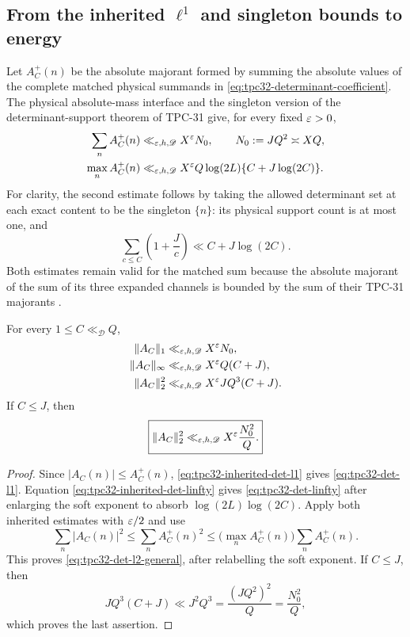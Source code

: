 \subsection{\texorpdfstring{From the inherited \(\ell^1\) and singleton
bounds to energy}{From the inherited l1 and singleton bounds to energy}}

Let $A_C^+(n)$ be the absolute majorant formed by summing the absolute
values of the complete matched physical summands in
\eqref{eq:tpc32-determinant-coefficient}.  The physical absolute-mass
interface and the singleton version of the determinant-support theorem
of TPC-31 give, for every fixed $\varepsilon>0$,
\begin{align}
 \sum_n A_C^+(n)
 &\ll_{\varepsilon,h,\mathscr D}X^\varepsilon N_0,
 \qquad N_0:=JQ^2\asymp XQ,
 \label{eq:tpc32-inherited-det-l1}\\
 \max_n A_C^+(n)
 &\ll_{\varepsilon,h,\mathscr D}
 X^\varepsilon Q\log(2L)
 \{C+J\log(2C)\}.
 \label{eq:tpc32-inherited-det-linfty}
\end{align}
For clarity, the second estimate follows by taking the allowed
determinant set at each exact content to be the singleton $\{n\}$:
its physical support count is at most one, and
\[
 \sum_{c\le C}\left(1+\frac Jc\right)
 \ll C+J\log(2C).
\]
Both estimates remain valid for the matched sum because the absolute
majorant of the sum of its three expanded channels is bounded by the
sum of their TPC-31 majorants \citep{WangTPC31}.

\begin{proposition}
\label{prop:tpc32-determinant-norms}
For every $1\le C\ll_{\mathscr D}Q$,
\begin{align}
 \|A_C\|_1
 &\ll_{\varepsilon,h,\mathscr D}X^\varepsilon N_0,
 \label{eq:tpc32-det-l1}\\
 \|A_C\|_\infty
 &\ll_{\varepsilon,h,\mathscr D}X^\varepsilon Q(C+J),
 \label{eq:tpc32-det-linfty}\\
 \|A_C\|_2^2
 &\ll_{\varepsilon,h,\mathscr D}
 X^\varepsilon JQ^3(C+J).
 \label{eq:tpc32-det-l2-general}
\end{align}
If $C\le J$, then
\begin{equation}
 \boxed{
 \|A_C\|_2^2
 \ll_{\varepsilon,h,\mathscr D}
 X^\varepsilon\frac{N_0^2}{Q}.}
 \label{eq:tpc32-det-l2-C-below-J}
\end{equation}
\end{proposition}

\begin{proof}
Since $|A_C(n)|\le A_C^+(n)$,
\eqref{eq:tpc32-inherited-det-l1} gives
\eqref{eq:tpc32-det-l1}.  Equation
\eqref{eq:tpc32-inherited-det-linfty} gives
\eqref{eq:tpc32-det-linfty} after enlarging the soft exponent to absorb
$\log(2L)\log(2C)$.  Apply both inherited estimates with $\varepsilon/2$ and
use
\[
 \sum_n|A_C(n)|^2
 \le\sum_n A_C^+(n)^2
 \le \bigl(\max_nA_C^+(n)\bigr)
       \sum_nA_C^+(n).
\]
This proves \eqref{eq:tpc32-det-l2-general}, after relabelling the
soft exponent.  If $C\le J$, then
\[
 JQ^3(C+J)\ll J^2Q^3
 =\frac{(JQ^2)^2}{Q}=\frac{N_0^2}{Q},
\]
which proves the last assertion.
\end{proof}

